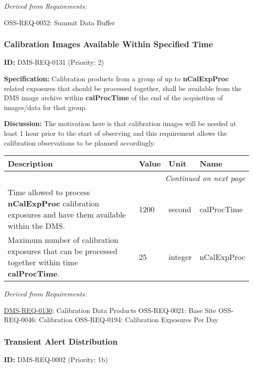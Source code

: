 \documentclass[SE,toc,lsstdraft]{lsstdoc}
\makeatletter
\newcommand{\paramname}[1]{\hspace{0pt}#1}
\newcommand{\unitname}[1]{\hspace{0pt}#1}
\newenvironment{parameters}[0]{%
\setlength\LTleft{0pt}
\setlength\LTright{\fill}
\begin{small}
\begin{longtable}[]{|p{0.49\textwidth}|l|p{0.6in}|p{1.70in}@{}|}

\hline \textbf{Description} & \textbf{Value} & \textbf{Unit} & \textbf{Name} \\ \hline
\endhead

\hline \multicolumn{4}{r}{\emph{Continued on next page}} \\
\endfoot

\hline\hline
\endlastfoot
}{%
\hline
\end{longtable}
\end{small}
}
\makeatother
\begin{document}
\emph{Derived from Requirements:}

OSS-REQ-0052:
Summit Data Buffer \newline

\subsubsection{Calibration Images Available Within Specified Time}

\label{DMS-REQ-0131}
\textbf{ID:} DMS-REQ-0131 (Priority: 2)

\textbf{Specification:} Calibration products from a group of up to \textbf{nCalExpProc} related exposures that should be processed together, shall be available from the DMS image archive within \textbf{calProcTime} of the end of the acquisition of images/data for that group.

\textbf{Discussion: }The motivation here is that calibration images will be needed at least 1 hour prior to the start of observing and this requirement allows the calibration observations to be planned accordingly.

\begin{parameters}
Time allowed to process \textbf{nCalExpProc} calibration exposures and have them available within the DMS.
&
1200
&
\unitname{%
second
}
&
\paramname{%
calProcTime
} \\\hline

Maximum number of calibration exposures that can be processed together within time \textbf{calProcTime}.

&
25
&
\unitname{%
integer
}
&
\paramname{%
nCalExpProc
} \\\hline
\end{parameters}

\emph{Derived from Requirements:}

\hyperref[DMS-REQ-0130]{DMS-REQ-0130}:
Calibration Data Products \newline
OSS-REQ-0021:
Base Site \newline
OSS-REQ-0046:
Calibration \newline
OSS-REQ-0194:
Calibration Exposures Per Day \newline

\subsubsection{Transient Alert Distribution}

\label{DMS-REQ-0002}
\textbf{ID:} DMS-REQ-0002 (Priority: 1b)
\end{document}
